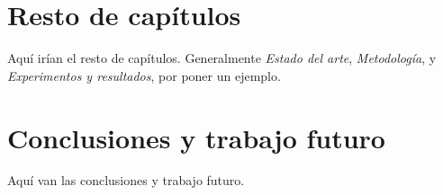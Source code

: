 \documentclass[11pt,a4paper]{book}
\begin{document}
\chapter{Resto de capítulos}
Aquí irían el resto de capítulos. Generalmente \emph{Estado del arte}, \emph{Metodología}, y \emph{Experimentos y resultados}, por poner un ejemplo.

\chapter{Conclusiones y trabajo futuro}
Aquí van las conclusiones y trabajo futuro.



\printglossary[type=\acronymtype, title={Acrónimos}]
\end{document}
